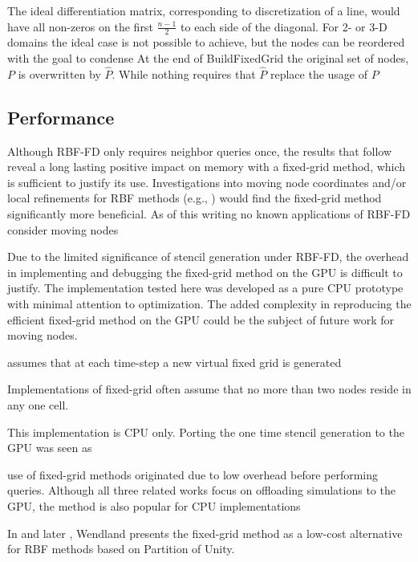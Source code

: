 \documentclass{report}
\begin{document}
The ideal differentiation matrix, corresponding to discretization of a line, would have all non-zeros on the first $\frac{n-1}{2}$ to each side of the diagonal. For 2- or 3-D domains the ideal case is not possible to achieve, but the nodes can be reordered with the goal to condense
At the end of BuildFixedGrid the original set of nodes, $P$ is overwritten by $\hat{P}$. While nothing requires that $\hat{P}$ replace the usage of $P$ 


\subsection{Performance} 

Although RBF-FD only requires neighbor queries once, the results that follow reveal a long lasting positive impact on memory with a fixed-grid method, which is sufficient to justify its use. Investigations into moving node coordinates and/or local refinements for RBF methods (e.g., \cite{FlyerLehto10}) would find the fixed-grid method significantly more beneficial. As of this writing no known applications of RBF-FD consider moving nodes

Due to the limited significance of stencil generation under RBF-FD, the overhead in implementing and debugging the fixed-grid method on the GPU is difficult to justify. The implementation tested here was developed as a pure CPU prototype with minimal attention to optimization. The added complexity in reproducing the efficient fixed-grid method on the GPU could be the subject of future work for moving nodes. 

    
\cite{Krog2010} assumes that at each time-step a new virtual fixed grid is generated 


Implementations of fixed-grid often assume that no more than two nodes reside in any one cell.  

This implementation is CPU only. Porting the one time stencil generation to the GPU was seen as 

use of fixed-grid methods originated due to low overhead before performing queries.
Although all three related works focus on offloading simulations to the GPU, the method is also popular for CPU implementations 

In \cite{Wendland2002} and later \cite{WendlandBook}, Wendland presents the fixed-grid method as a low-cost alternative for RBF methods based on Partition of Unity. %
\end{document}
